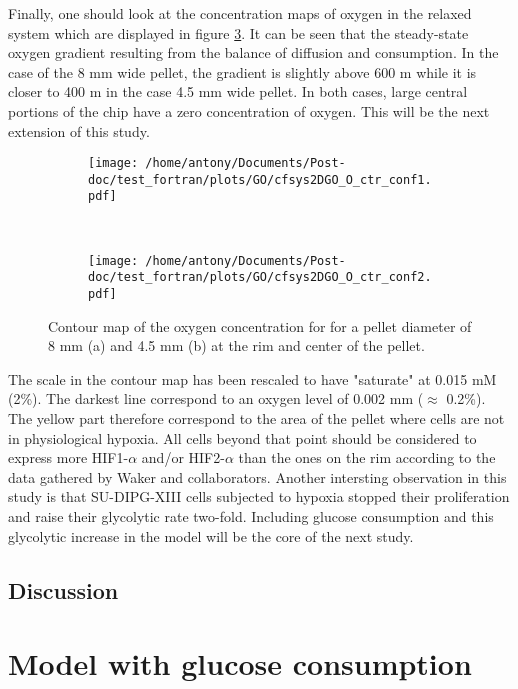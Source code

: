 \documentclass[11pt,a4paper]{article}
\begin{document}
Finally, one should look at the concentration maps of oxygen in the relaxed system which are displayed in figure \ref{O_ctrmap}. It can be seen that the steady-state oxygen gradient resulting from the balance of diffusion and consumption. In the case of the 8 mm wide pellet, the gradient is slightly above 600 \textmu m while it is closer to 400 \textmu m in the case 4.5 mm wide pellet. In both cases, large central portions of the chip have a zero concentration of oxygen. This will be the next extension of this study.

\begin{figure}[ht!]
	\begin{subfigure}{0.45\textwidth}
	\centering
	\texttt{[image: /home/antony/Documents/Post-doc/test\_fortran/plots/GO/cfsys2DGO\_O\_ctr\_conf1.pdf]}
	\caption{ \label{O_ctr_conf1}}
	\end{subfigure}
	~~
	\begin{subfigure}{0.45\textwidth}
	\texttt{[image: /home/antony/Documents/Post-doc/test\_fortran/plots/GO/cfsys2DGO\_O\_ctr\_conf2.pdf]}
		\caption{ \label{O_ctr_conf2}}
	\end{subfigure}
	\caption{Contour map of the oxygen concentration for for a pellet diameter of 8 mm (a) and 4.5 mm (b) at the rim and center of the pellet. \label{O_ctrmap}}
\end{figure}

The scale in the contour map has been rescaled to have "saturate" at 0.015 mM (2\%). The darkest line correspond to an oxygen level of 0.002 mm ($\approx$ 0.2\%). The yellow part therefore correspond to the area of the pellet where cells are not in physiological hypoxia. All cells beyond that point should be considered to express more HIF1-$\alpha$ and/or HIF2-$\alpha$ than the ones on the rim according to the data gathered by Waker and collaborators. Another intersting observation in this study is that SU-DIPG-XIII cells subjected to hypoxia stopped their proliferation and raise their glycolytic rate two-fold.\cite{Waker2018} Including glucose consumption and this glycolytic increase in the model will be the core of the next study. 

\subsection{Discussion}

\section{Model with glucose consumption}
\end{document}
